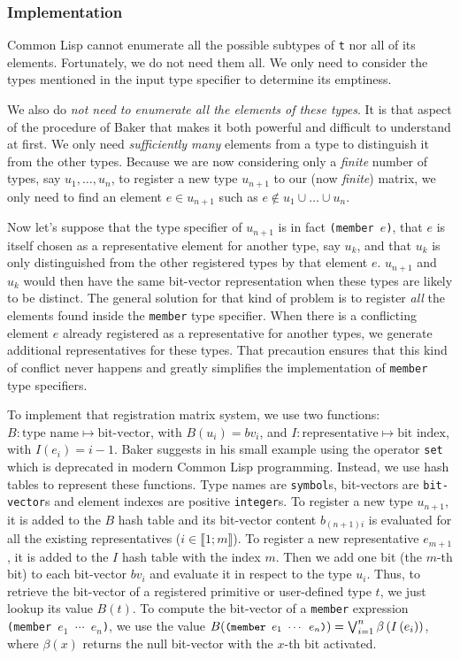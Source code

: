 \documentclass[format=sigconf]{acmart}
\newcommand\intvl[1]{\llbracket#1\rrbracket}
\newcommand\code[2][\small]{\sloppy\texttt{#1#2}}
\newcommand\mcode[2][\small]{\text{\code[#1]{#2}}}
\theoremstyle{definition}
\begin{document}
\subsubsection{Implementation}
Common Lisp cannot enumerate all the possible subtypes of \code{t} nor all of
its elements. Fortunately, we do not need them all. We only need to consider the
types mentioned in the input type specifier to determine its emptiness.

We also do \emph{not need to enumerate all the elements of these types}.
It is that aspect of the procedure of Baker that makes it both powerful and
difficult to understand at first. We only need \emph{sufficiently many} elements
from a type to distinguish it from the other types.
Because we are now considering only a \emph{finite} number of types, say $u_1,
\dots, u_n$, to register a new type $u_{n+1}$ to our (now \emph{finite}) matrix,
we only need to find an element $e \in u_{n+1}$ such as $e \notin u_1 \cup \dots
\cup u_n$.

Now let's suppose that the type specifier of $u_{n+1}$ is in fact \code{(member
  $e$)}, that $e$ is itself chosen as a representative element for another type,
say $u_k$, and that $u_k$ is only distinguished from the other registered types
by that element $e$. $u_{n+1}$ and $u_k$ would then have the same bit-vector
representation when these types are likely to be distinct. The general solution
for that kind of problem is to register \emph{all} the elements found inside the
\code{member} type specifier. When there is a conflicting element $e$ already
registered as a representative for another types, we generate additional
representatives for these types. That precaution ensures that this kind of
conflict never happens and greatly simplifies the implementation of \code{member}
type specifiers.

To implement that registration matrix system, we use two functions:
\sloppy${B : \text{type name} \longmapsto \text{bit-vector}}$,
with $B(u_i) = bv_i$, and
\sloppy${I : \text{representative} \longmapsto \text{bit index}}$,
with $I(e_i) = i - 1$.
Baker suggests in his small example \cite{baker1992} using the operator
\code{set} which is deprecated in modern Common Lisp programming. Instead, we
use hash tables to represent these functions. Type names are \code{symbol}s,
bit-vectors are \code{bit-vector}s and element indexes are positive
\code{integer}s. To register a new type $u_{n+1}$, it is added to the $B$ hash
table and its bit-vector content $b_{(n+1)i}$ is evaluated for all the existing
representatives ($i \in \intvl{1;m}$). To register a new representative
$e_{m+1}$, it is added to the $I$ hash table with the index $m$. Then we add one
bit (the $m$-th bit) to each bit-vector $bv_i$ and evaluate it in respect to the
type $u_i$. Thus, to retrieve the bit-vector of a registered primitive or
user-defined type $t$, we just lookup its value $B(t)$. To compute the
bit-vector of a \code{member} expression \code{(member $e_1$ $\cdots$ $e_n$)},
we use the value
$B(\mcode{(member $e_1$ $\cdots$ $e_n$)}) = \bigvee_{i=1}^n
\beta\left(I\left(e_i\right)\right)$,
where $\beta(x)$ returns the null bit-vector with the $x$-th bit activated.
\end{document}
